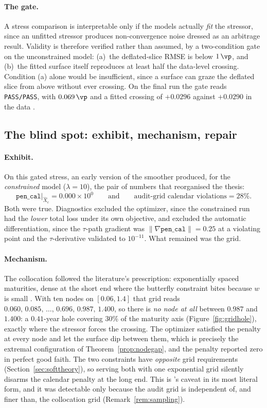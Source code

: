 \paragraph{The gate.} A stress comparison is interpretable only if the models actually
\emph{fit} the stressor, since an unfitted stressor produces non-convergence noise dressed as
an arbitrage result. Validity is therefore verified rather than assumed, by a two-condition
gate on the unconstrained model: (a)~the deflated-slice RMSE is below $1\,\vp$, and (b)~the
fitted surface itself reproduces at least half the data-level crossing. Condition (a) alone
would be insufficient, since a surface can graze the deflated slice from above without ever
crossing. On the final run the gate reads \texttt{PASS/PASS}, with $0.069\,\vp$ and a fitted
crossing of $+0.0296$ against $+0.0290$ in the data .

\subsection{The blind spot: exhibit, mechanism, repair}\label{sec:blindspot}

\paragraph{Exhibit.} On this gated stress, an early version of the smoother produced, for the
\emph{constrained} model ($\lambda=10$), the pair of numbers that reorganised the thesis:
\[
\texttt{pen\_cal}\big|_{\hat X_{\mathrm c}}=0.000\times10^{0}
\qquad\text{and}\qquad
\text{audit-grid calendar violations}=28\% .
\]
Both were true. Diagnostics excluded the optimizer, since the constrained run had the
\emph{lower} total loss under its own objective, and excluded the automatic differentiation,
since the $\tau$-path gradient was $\|\nabla\texttt{pen\_cal}\|=0.25$ at a violating point and
the $\tau$-derivative validated to $10^{-11}$. What remained was the grid.

\paragraph{Mechanism.} The collocation followed the literature's prescription: exponentially
spaced maturities, dense at the short end where the butterfly constraint bites because $w$ is
small \cite{ackerer2020}. With ten nodes on $[0.06,1.4]$ that grid reads
$0.060,\,0.085,\,\dots,\,0.696,\,0.987,\,1.400$, so there is \emph{no node at all} between
$0.987$ and $1.400$: a $0.41$-year hole covering $30\%$ of the maturity axis
(Figure~\ref{fig:gridhole}), exactly where the stressor forces the crossing. The optimizer
satisfied the penalty at every node and let the surface dip between them, which is precisely
the extremal configuration of Theorem~\ref{prop:nodegap}, and the penalty reported zero in
perfect good faith. The two constraints have \emph{opposite} grid requirements
(Section~\ref{sec:softtheory}), so serving both with one exponential grid silently disarms the
calendar penalty at the long end. This is \cite{chataigner2020}'s caveat in its most literal
form, and it was detectable only because the audit grid is independent of, and finer than, the
collocation grid (Remark~\ref{rem:sampling}).

